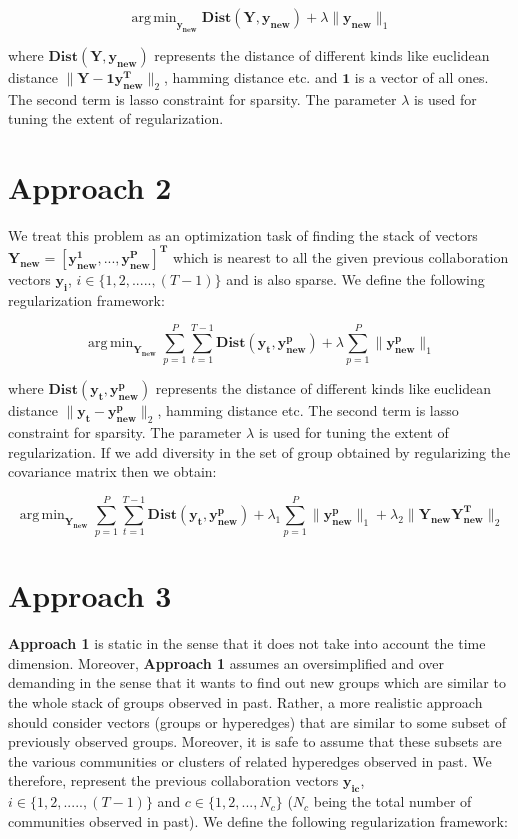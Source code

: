 \documentclass{sig-alternate}
\DeclareMathOperator*{\argmin}{arg\,min}
\begin{document}
\begin{equation}
\argmin_{\mathbf{y_{new}}}   \mathbf{Dist(Y,y_{new})} + \lambda \| \mathbf{y_{new}} \|_{1}
\end{equation}

where $\mathbf{Dist(Y,y_{new})}$ represents the distance of different kinds like euclidean distance $\| \mathbf{Y}-\mathbf{1y_{new}^T} \|_2$, hamming distance etc. and $\mathbf{1}$ is a vector of all ones. The second term is lasso constraint for sparsity. The parameter $\lambda$ is used for tuning the extent of regularization.

\section{Approach 2}

We treat this problem as an optimization task of finding the stack of vectors $\mathbf{Y_{new} = [y_{new}^{1},...,y_{new}^{P}]^{T}}$ which is nearest to all the given previous collaboration vectors $\mathbf{y_i}$, $i \in \{1,2,.....,(T-1)\}$ and is also sparse. We define the following regularization framework:

\begin{equation}
\argmin_{\mathbf{Y_{new}}}   \sum_{p=1}^{P}  \sum_{t=1}^{T-1} \mathbf{Dist(y_t,y_{new}^{p})} + \lambda \sum_{p=1}^{P} \| \mathbf{y_{new}^{p}} \|_{1}
\end{equation}

where $\mathbf{Dist(y_t,y_{new}^{p})}$ represents the distance of different kinds like euclidean distance $\| \mathbf{y_t}-\mathbf{y_{new}^{p}} \|_2$, hamming distance etc. The second term is lasso constraint for sparsity. The parameter $\lambda$ is used for tuning the extent of regularization. If we add diversity in the set of group obtained by regularizing the covariance matrix then we obtain:

\begin{equation}
\argmin_{\mathbf{Y_{new}}}   \sum_{p=1}^{P}  \sum_{t=1}^{T-1} \mathbf{Dist(y_t,y_{new}^{p})} + \lambda_1 \sum_{p=1}^{P} \| \mathbf{y_{new}^{p}} \|_{1} + \lambda_2 \| \mathbf{Y_{new}Y_{new}^{T}}\|_2
\end{equation}


\section{Approach 3}

\textbf{Approach 1} is static in the sense that it does not take into account the time dimension. Moreover, \textbf{Approach 1} assumes an oversimplified and over demanding in the sense that it wants to find out new groups which are similar to the whole stack of groups observed in past. Rather, a more realistic approach should consider vectors (groups or hyperedges) that are similar to some subset of previously observed groups. Moreover, it is safe to assume that these subsets are the various communities or clusters of related hyperedges observed in past. We therefore, represent the previous collaboration vectors $\mathbf{y_{ic}}$, $i \in \{1,2,.....,(T-1)\}$ and $c \in \{1,2,...,N_c\}$ ($N_c$ being the total number of communities observed in past). We define the following regularization framework:
\end{document}
